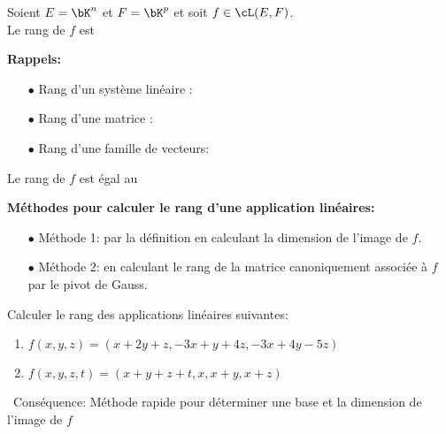 \documentclass[a4paper, 11pt]{article}
\begin{document}


\begin{defi}
Soient $E=\bK^n$ et $F=\bK^p$ et soit $f\in\cL(E,F)$.\vsec\\
\noindent Le rang de $f$ est \dotfill \\
\vspace{0.4cm}
\end{defi}




\noindent \textbf{Rappels:}
\begin{itemize}
\item[$\bullet$] Rang d'un syst\`{e}me lin\'eaire : \dotfill
\item[$\bullet$] Rang d'une matrice : \dotfill
\item[$\bullet$] Rang d'une famille de vecteurs: \dotfill
\end{itemize}
\vsec



\begin{prop} 
Le rang de $f$ est \'egal au \dotfill 
\end{prop}


\begin{dboxminipage}{0.7\textwidth}
\textbf{M\'ethodes pour calculer le rang d'une application lin\'eaires:}
\begin{itemize}
\item[$\bullet$] M\'ethode 1: par la d\'efinition en calculant la dimension de l'image de $f$.
\item[$\bullet$] M\'ethode 2: en calculant le rang de la matrice canoniquement associ\'ee \`{a} $f$ par le pivot de Gauss.
\end{itemize}
\end{dboxminipage}




 

{\footnotesize \begin{exercice} 
Calculer le rang des applications lin\'eaires suivantes:
\begin{enumerate}
\item $f(x,y,z)=(x+2y+z, -3x+y+4z, -3x+4y-5z)$
\item $f(x,y,z,t)=(x+y+z+t, x, x+y, x+z)$
\end{enumerate}
\end{exercice}
}


\vspace{0.4cm}

\noindent\ {Cons\'equence: M\'ethode rapide pour d\'eterminer une base et la dimension de l'image de $f$}\vsec\\
\end{document}
